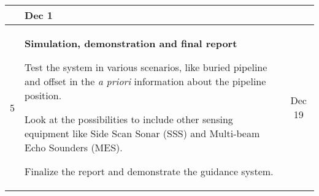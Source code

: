\documentclass[a4paper,10pt]{article}
\newenvironment{myitemize}
{
    \begin{list}{- \ }{}
        \setlength{\topsep}{0pt}
        \setlength{\parskip}{0pt}
        \setlength{\partopsep}{0pt}
        \setlength{\parsep}{0pt}
        \setlength{\itemsep}{0pt} 
}
{
    \end{list} 
}
\begin{document}
\begin{tabular}{| c | p{9cm} || c |}
\begin{myitemize}
	 	 	               		\end{myitemize}
								&	Dec 1 \\
	\hline
	5	&	\textbf{Simulation, demonstration and final report}
						\begin{myitemize}
						 \item Test the system in various scenarios, like buried pipeline and offset in the \textit{a priori} information about the pipeline position.
						 \item Look at the possibilities to include other sensing equipment like Side Scan Sonar (SSS) and Multi-beam Echo Sounders (MES).
						 \item Finalize the report and demonstrate the guidance system.
						\end{myitemize}
								&	Dec 19 \\
	\hline
	\end{tabular}
\end{document}
